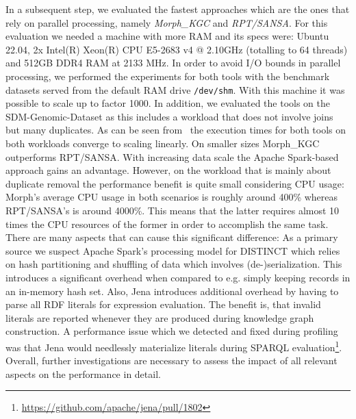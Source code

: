 In a subsequent step, we evaluated the fastest approaches which are the ones that rely on parallel processing, namely \emph{Morph\_KGC} and \emph{RPT/SANSA}.
For this evaluation we needed a machine with more RAM and its specs were: Ubuntu 22.04, 2x Intel(R) Xeon(R) CPU E5-2683 v4 @ 2.10GHz (totalling to 64 threads) and 512GB DDR4 RAM at 2133 MHz. In order to avoid I/O bounds in parallel processing, we performed the experiments for both tools with the benchmark datasets served from the default RAM drive \texttt{/dev/shm}.
With this machine it was possible to scale up to factor 1000.
In addition, we evaluated the tools on the SDM-Genomic-Dataset as this includes a workload that does not involve joins but many duplicates.
As can be seen from~ the execution times for both tools on both workloads converge to scaling linearly.
On smaller sizes Morph\_KGC outperforms RPT/SANSA. With increasing data scale the Apache Spark-based approach gains an advantage. However, on the workload that is mainly about duplicate removal the performance benefit is quite small considering CPU usage:
Morph's average CPU usage in both scenarios is roughly around 400\% whereas RPT/SANSA's is around 4000\%. This means that the latter requires almost 10 times the CPU resources of the former in order to accomplish the same task.
There are many aspects that can cause this significant difference: As a primary source we suspect Apache Spark's processing model for DISTINCT which relies on hash partitioning and shuffling of data which involves (de-)serialization. This introduces a significant overhead when compared to e.g. simply keeping records in an in-memory hash set. Also, Jena introduces additional overhead by having to parse all RDF literals for expression evaluation.
The benefit is, that invalid literals are reported whenever they are produced during knowledge graph construction.
A performance issue which we detected and fixed during profiling was that Jena would needlessly materialize literals during SPARQL evaluation\footnote{\url{https://github.com/apache/jena/pull/1802}}. Overall, further investigations are necessary to assess the impact of all relevant aspects on the performance in detail.


